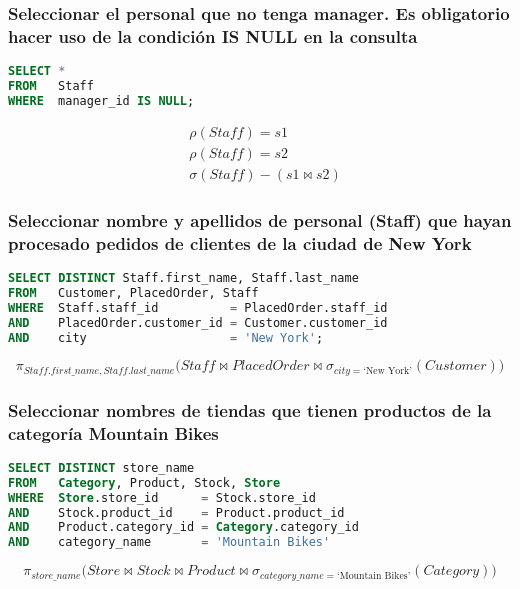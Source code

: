 \subsubsection{Seleccionar el personal que no tenga manager. Es obligatorio hacer uso de la condición IS NULL en la consulta}

\begin{lstlisting}[language=SQL]
SELECT *
FROM   Staff
WHERE  manager_id IS NULL;
\end{lstlisting}

\[
\begin{split}
	& \rho(Staff)=s1 \\
	& \rho(Staff)=s2 \\
	& \sigma(Staff)-(s1\bowtie s2)
\end{split}
\]

\subsubsection{Seleccionar nombre y apellidos de personal (Staff) que hayan procesado pedidos de clientes de la ciudad de New York}

\begin{lstlisting}[language=SQL]
SELECT DISTINCT Staff.first_name, Staff.last_name
FROM   Customer, PlacedOrder, Staff
WHERE  Staff.staff_id          = PlacedOrder.staff_id
AND    PlacedOrder.customer_id = Customer.customer_id
AND    city                    = 'New York';
\end{lstlisting}

\[\pi_{Staff.first\_name, Staff.last\_name}\big(Staff\bowtie PlacedOrder\bowtie\sigma_{city=\text{`New York'}}(Customer)\big)\]

\subsubsection{Seleccionar nombres de tiendas que tienen productos de la categoría Mountain Bikes}

\begin{lstlisting}[language=SQL]
SELECT DISTINCT store_name
FROM   Category, Product, Stock, Store
WHERE  Store.store_id      = Stock.store_id
AND    Stock.product_id    = Product.product_id
AND    Product.category_id = Category.category_id
AND    category_name       = 'Mountain Bikes'
\end{lstlisting}

\[\pi_{store\_name}\big(Store\bowtie Stock\bowtie Product\bowtie\sigma_{category\_name=\text{`Mountain Bikes'}}(Category)\big)\]

